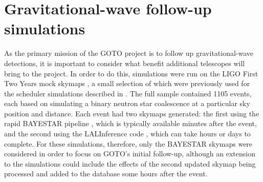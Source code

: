 
\section{Gravitational-wave follow-up simulations}
\label{sec:gw_sims}


\begin{colsection}

As the primary mission of the GOTO project is to follow up gravitational-wave detections, it is important to consider what benefit additional telescopes will bring to the project. In order to do this, simulations were run on the LIGO First Two Years mock skymaps \citep{First2Years}, a small selection of which were previously used for the scheduler simulations described in . The full sample contained 1105 events, each based on simulating a binary neutron star coalescence at a particular sky position and distance. Each event had two skymaps generated: the first using the rapid BAYESTAR pipeline \citep{BAYESTAR}, which is typically available minutes after the event, and the second using the LALInference code \citep{LALInference}, which can take hours or days to complete. For these simulations, therefore, only the BAYESTAR skymaps were considered in order to focus on GOTO's initial follow-up, although an extension to the simulations could include the effects of the second updated skymap being processed and added to the database some hours after the event.

\end{colsection}


